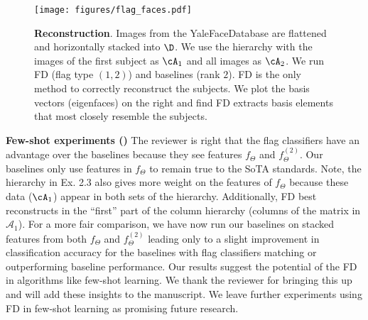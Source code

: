 \documentclass[10pt,twocolumn,letterpaper]{article}
\begin{document}
\begin{figure}[t!]
    \centering
    \texttt{[image: figures/flag\_faces.pdf]}
    \vspace{-5mm}
    \footnotesize
    \caption{\footnotesize \textbf{Reconstruction}. Images from the YaleFaceDatabase are flattened and horizontally stacked into $\D$. We use the hierarchy with the images of the first subject as $\cA_1$ and all images as $\cA_2$. We run FD (flag type $(1,2)$) and baselines (rank $2$). FD is the only method to correctly reconstruct the subjects. We plot the basis vectors (eigenfaces) on the right and find FD extracts basis elements that most closely resemble the subjects.}
    \vspace{-6mm}
    \label{fig:flag cartoon2}
\end{figure}
\noindent \textbf{Few-shot experiments (\Rtwo)}
The reviewer is right that the flag classifiers have an advantage over the baselines because they see features $f_{\Theta}$ and $f_{\Theta}^{(2)}$. Our baselines only use features in $f_{\Theta}$ to remain true to the SoTA standards.
Note, the hierarchy in Ex. 2.3 also gives more weight on the features of $f_{\Theta}$ because these data ($\cA_1$) appear in both sets of the hierarchy. Additionally, FD best reconstructs in the ``first'' part of the column hierarchy (columns of the matrix in $\mathcal{A}_1$).
For a more fair comparison, we have now run our baselines on stacked features from both $f_{\Theta}$ and $f_{\Theta}^{(2)}$ leading only to a slight improvement in classification accuracy for the baselines with flag classifiers matching or outperforming baseline performance. Our results suggest the potential of the FD in algorithms like few-shot learning.
We thank the reviewer for bringing this up and will add these insights to the manuscript.
We leave further experiments using FD in few-shot learning as promising future research.

\end{document}
